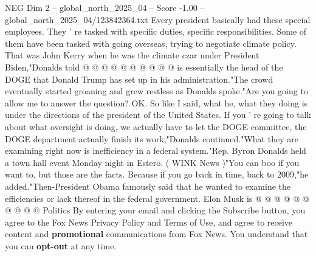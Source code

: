 \begin{textsample}{NEG Dim 2 – global\_north\_2025\_04 – Score -1.00 – global\_north\_2025\_04/123842364.txt}
Every president basically had these special employees.
They ' re tasked with specific duties, specific responsibilities.
Some of them have been tasked with going overseas, trying to negotiate climate policy.
That was John Kerry when he was the climate czar under President Biden,"Donalds told @ @ @ @ @ @ @ @ @ @ is essentially the head of the DOGE that Donald Trump has set up in his administration."The crowd eventually started groaning and grew restless as Donalds spoke."Are you going to allow me to answer the question?
OK.
So like I said, what he, what they doing is under the directions of the president of the United States.
If you ' re going to talk about what oversight is doing, we actually have to let the DOGE committee, the DOGE department actually finish its work,"Donalds continued."What they are examining right now is inefficiency in a federal system."Rep.
Byron Donalds held a town hall event Monday night in Estero. ( WINK News )"You can boo if you want to, but those are the facts.
Because if you go back in time, back to 2009,"he added."Then-President Obama famously said that he wanted to examine the efficiencies or lack thereof in the federal government.
Elon Musk is @ @ @ @ @ @ @ @ @ @ Politics By entering your email and clicking the Subscribe button, you agree to the Fox News Privacy Policy and Terms of Use, and agree to receive content and \textbf{promotional} communications from Fox News.
You understand that you can \textbf{opt-out} at any time.

\end{textsample}
